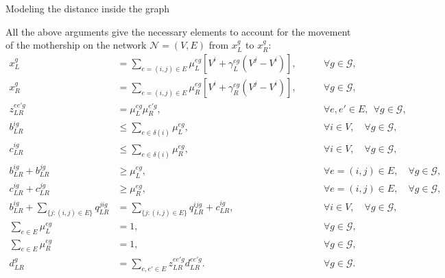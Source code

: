 \documentclass[slidestop,usepdftitle=false,10pt]{beamer}
\begin{document}
	\begin{frame}{Modeling the distance inside the graph}
	    
        \begin{tiny}
        	All the above arguments give the necessary elements to account for the movement of the mothership on the network $\mathcal{N}=(V,E)$ from $x_L^g$ to $x_R^g$:
        \begin{align}
            x_L^g & = \sum_{e=(i, j)\in E} \mu_{L}^{eg}\left[V^i + \gamma_{L}^{eg}(V^j - V^i)\right], &\qquad \forall g \in \mathcal{G}, \label{g:param1bisg}\\
            x_R^g & = \sum_{e=(i, j)\in E} \mu_{R}^{eg}\left[ V^i + \gamma_{R}^{eg}(V^j - V^i)\right], &\qquad \forall g \in \mathcal{G}, \label{g:param2bisg}\\
            z_{LR}^{ee'g} & = \mu_{L}^{eg}\mu_{R}^{e'g}, &\qquad \forall e,e' \in E, \:\: \forall g \in \mathcal{G},\label{g:prodLR}\\
            b_{LR}^{ig} & \leq \sum_{e\in\delta(i)} \mu_{L}^{eg}, \label{g:bLt1}&\qquad \forall i\in V, \quad \forall g \in \mathcal{G}, \\
            c_{LR}^{ig} & \leq \sum_{e\in\delta(i)} \mu_{R}^{eg}, \label{g:cLt1}&\qquad \forall i\in V, \quad \forall g \in \mathcal{G},\\
            b_{LR}^{ig} + b_{LR}^{jg} & \geq \mu_L^{eg}, &\qquad \forall e=(i, j)\in E, \quad \forall g \in \mathcal{G},\label{g:bLt2}\\
            c_{LR}^{ig} + c_{LR}^{jg} & \geq \mu_R^{eg}, &\qquad \forall e=(i, j)\in E, \quad \forall g \in \mathcal{G}, \label{g:cLt2}\\
            b_{LR}^{ig} + \sum_{\{j:(i, j)\in E\}} q_{LR}^{jig} & = \sum_{\{j:(i, j)\in E\}} q_{LR}^{ijg} +  c_{LR}^{ig}, \label{g:flow}&\qquad \forall i \in V, \quad \forall g \in \mathcal{G},\\
            \sum_{e\in E} \mu_{L}^{eg} & = 1, &\qquad \forall g \in \mathcal{G}, \label{g:muLe} \\
            \sum_{e\in E} \mu_{R}^{eg} & = 1, &\qquad \forall g \in \mathcal{G}, \label{g:muRe}\\
            d_{LR}^g & = \sum_{e, e'\in E} z_{LR}^{ee'g} d_{LR}^{ee'g}. &\qquad \forall g \in \mathcal{G}. \label{g:dLRgN}
        \end{align}
        \end{tiny}
	    
	\end{frame}
	
\end{document}
